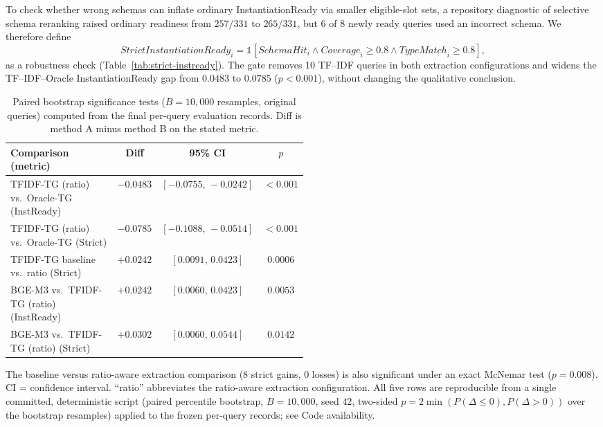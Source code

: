 \documentclass[pdflatex,sn-basic,Numbered]{sn-jnl}
\begin{document}
To check whether wrong schemas can inflate ordinary InstantiationReady via smaller eligible-slot sets, a repository diagnostic of selective schema reranking raised ordinary readiness from $257/331$ to $265/331$, but $6$ of $8$ newly ready queries used an incorrect schema. We therefore define
\begin{equation}
\mathit{StrictInstantiationReady}_i = \mathbb{1}\!\left[\mathit{SchemaHit}_i \wedge \mathit{Coverage}_i \geq 0.8 \wedge \mathit{TypeMatch}_i \geq 0.8\right],
\label{eq:strict_instantiation_ready}
\end{equation}
as a robustness check (Table~\ref{tab:strict-instready}). The gate removes 10 TF--IDF queries in both extraction configurations and widens the TF--IDF--Oracle InstantiationReady gap from $0.0483$ to $0.0785$ ($p<0.001$), without changing the qualitative conclusion.

\begin{table}[t]
\centering
\caption{Paired bootstrap significance tests ($B=10{,}000$ resamples, original queries) computed from the final per-query evaluation records. Diff is method A minus method B on the stated metric.}
\label{tab:nlp4lp-significance}
\small
\setlength{\tabcolsep}{2.5pt}
\begin{tabular}{@{}p{0.50\linewidth}ccc@{}}
  \toprule
  Comparison (metric) & Diff & 95\% CI & $p$ \\
  \midrule
  TFIDF-TG (ratio) vs.\ Oracle-TG (InstReady) & $-0.0483$ & $[-0.0755,\,-0.0242]$ & $<0.001$ \\
  TFIDF-TG (ratio) vs.\ Oracle-TG (Strict) & $-0.0785$ & $[-0.1088,\,-0.0514]$ & $<0.001$ \\
  TFIDF-TG baseline vs.\ ratio (Strict) & $+0.0242$ & $[0.0091,\,0.0423]$ & $0.0006$ \\
  BGE-M3 vs.\ TFIDF-TG (ratio) (InstReady) & $+0.0242$ & $[0.0060,\,0.0423]$ & $0.0053$ \\
  BGE-M3 vs.\ TFIDF-TG (ratio) (Strict) & $+0.0302$ & $[0.0060,\,0.0544]$ & $0.0142$ \\
  \bottomrule
\end{tabular}

\vspace{2mm}
\raggedright
\footnotesize
The baseline versus ratio-aware extraction comparison (8 strict gains, 0 losses) is also significant under an exact McNemar test ($p=0.008$). CI = confidence interval. ``ratio'' abbreviates the ratio-aware extraction configuration. All five rows are reproducible from a single committed, deterministic script (paired percentile bootstrap, $B=10{,}000$, seed $42$, two-sided $p=2\min(P(\Delta\leq 0),P(\Delta>0))$ over the bootstrap resamples) applied to the frozen per-query records; see Code availability.
\end{table}
\end{document}

